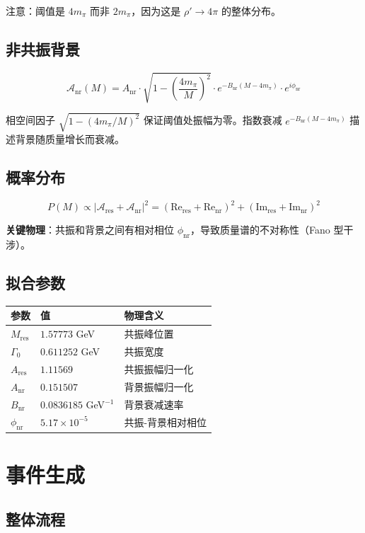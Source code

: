 \documentclass[11pt,a4paper,UTF8]{ctexart}
\begin{document}
注意：阈值是 $4m_\pi$ 而非 $2m_\pi$，因为这是 $\rho' \to 4\pi$ 的整体分布。

\subsection{非共振背景}

\[
\mathcal{A}_{\text{nr}}(M) = A_{\text{nr}} \cdot \sqrt{1 - \left(\frac{4m_\pi}{M}\right)^2} \cdot e^{-B_{\text{nr}}(M - 4m_\pi)} \cdot e^{i\phi_{\text{nr}}}
\]

相空间因子 $\sqrt{1 - (4m_\pi/M)^2}$ 保证阈值处振幅为零。指数衰减 $e^{-B_{\text{nr}}(M-4m_\pi)}$ 描述背景随质量增长而衰减。

\subsection{概率分布}

\[
P(M) \propto |\mathcal{A}_{\text{res}} + \mathcal{A}_{\text{nr}}|^2 = (\text{Re}_{\text{res}} + \text{Re}_{\text{nr}})^2 + (\text{Im}_{\text{res}} + \text{Im}_{\text{nr}})^2
\]

\textbf{关键物理}：共振和背景之间有相对相位 $\phi_{\text{nr}}$，导致质量谱的不对称性（Fano 型干涉）。

\subsection{拟合参数}

\begin{longtable}{l l l}
\toprule
\textbf{参数} & \textbf{值} & \textbf{物理含义} \\
\midrule
$M_{\text{res}}$ & $1.57773$ GeV & 共振峰位置 \\
$\Gamma_0$ & $0.611252$ GeV & 共振宽度 \\
$A_{\text{res}}$ & $1.11569$ & 共振振幅归一化 \\
$A_{\text{nr}}$ & $0.151507$ & 背景振幅归一化 \\
$B_{\text{nr}}$ & $0.0836185$ GeV$^{-1}$ & 背景衰减速率 \\
$\phi_{\text{nr}}$ & $5.17 \times 10^{-5}$ & 共振-背景相对相位 \\
\bottomrule
\end{longtable}

\section{事件生成}

\subsection{整体流程}
\end{document}
